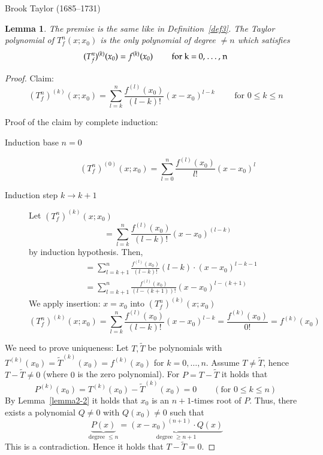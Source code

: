 \documentclass{article}
\newtheorem{lemma}{Lemma}  \numberwithin{lemma}{section}
\begin{document}
Brook Taylor (1685--1731)

\begin{lemma} %
  The premise is the same like in Definition~\ref{def3}.
  The Taylor polynomial of $T_f^n(x; x_0)$ is the only polynomial of degree $\neq n$ which satisfies
  \[ (T_f^n)^{(k)}(x_0) = f^{(k)}(x_0) \qquad \text{ for k = 0, \dots, n} \]
\end{lemma}

\begin{proof}
  Claim:
  \[ (T_f^n)^{(k)}(x; x_0) = \sum_{l=k}^n \frac{f^{(l)}(x_0)}{(l - k)!} (x - x_0)^{l-k} \qquad \text{ for } 0 \leq k \leq n \]

  Proof of the claim by complete induction:
  \begin{description}
    \item[Induction base $n = 0$] 
      \[ (T_f^n)^{(0)} (x; x_0) = \sum_{l=0}^n \frac{f^{(l)}(x_0)}{l!} (x - x_0)^l \]
    \item[Induction step $k \to k + 1$]
      Let $(T_f^n)^{(k)}(x; x_0)$
      \[ = \sum_{l=k}^{n} \frac{f^{(l)}(x_0)}{(l - k)!} (x - x_0)^{(l-k)} \]
      by induction hypothesis. Then,
      \begin{align*}
        &= \sum_{l=k+1}^n \frac{f^{(l)}(x_0)}{(l-k)!} (l - k) \cdot (x - x_0)^{l - k - 1} \\
        &= \sum_{l=k+1}^n \frac{f^{(l)}(x_0)}{(l - (k+1))!} (x - x_0)^{l - (k+1)}
      \end{align*}
      We apply insertion: $x = x_0$ into $(T_f^n)^{(k)}(x; x_0)$
      \[ (T_f^n)^{(k)}(x; x_0) = \sum_{l=k}^n \frac{f^{(l)}(x_0)}{(l - k)!} (x - x_0)^{l-k} = \frac{f^{(k)}(x_0)}{0!} = f^{(k)}(x_0) \]
  \end{description}

  We need to prove uniqueness: Let $T, \tilde T$ be polynomials with $T^{(k)}(x_0) = \tilde T^{(k)}(x_0) = f^{(k)}(x_0)$ for $k = 0, \dots, n$.
  Assume $T \neq \tilde T$, hence $T - \tilde T \neq 0$ (where $0$ is the zero polynomial).
  For $P = T - \tilde T$ it holds that
  \[ P^{(k)}(x_0) = T^{(k)}(x_0) - \tilde T^{(k)}(x_0) = 0 \qquad (\text{for } 0 \leq k \leq n) \]
  By Lemma~\ref{lemma2-2} it holds that $x_0$ is an $n+1$-times root of $P$. Thus, there exists a polynomial $Q \neq 0$ with $Q(x_0) \neq 0$ such that
  \[ \underbrace{P(x)}_{\text{degree } \leq n} = \underbrace{(x - x_0)^{(n+1)} \cdot Q(x)}_{\text{degree } \geq n+1} \]
  This is a contradiction. Hence it holds that $T - \tilde T = 0$.
\end{proof}
\end{document}
